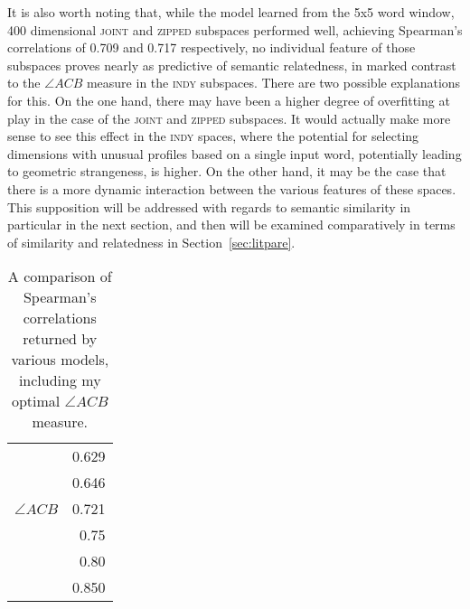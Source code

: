 It is also worth noting that, while the model learned from the 5x5 word window, 400 dimensional \textsc{joint} and \textsc{zipped} subspaces performed well, achieving Spearman's correlations of 0.709 and 0.717 respectively, no individual feature of those subspaces proves nearly as predictive of semantic relatedness, in marked contrast to the $\angle ACB$ measure in the \textsc{indy} subspaces.  There are two possible explanations for this.  On the one hand, there may have been a higher degree of overfitting at play in the case of the \textsc{joint} and \textsc{zipped} subspaces.  It would actually make more sense to see this effect in the \textsc{indy} spaces, where the potential for selecting dimensions with unusual profiles based on a single input word, potentially leading to geometric strangeness, is higher.  On the other hand, it may be the case that there is a more dynamic interaction between the various features of these spaces.  This supposition will be addressed with regards to semantic similarity in particular in the next section, and then will be examined comparatively in terms of similarity and relatedness in Section~\ref{sec:litpare}.

\begin{table}
\centering
\begin{tabular}{lr}
\hline
\cite{HassanEA2011} & 0.629 \\
\cite{LuongEA2013} & 0.646 \\
$\angle ACB$ & 0.721 \\
\cite{GabrilovichEA2007} & 0.75 \\
\cite{RadinskyEA2011} & 0.80 \\
\cite{HalawiEA2012} & 0.850 \\
\hline
\end{tabular}
\caption{A comparison of Spearman's correlations returned by various models, including my optimal $\angle ACB$ measure.}
\label{tab:relpare}
\end{table}

